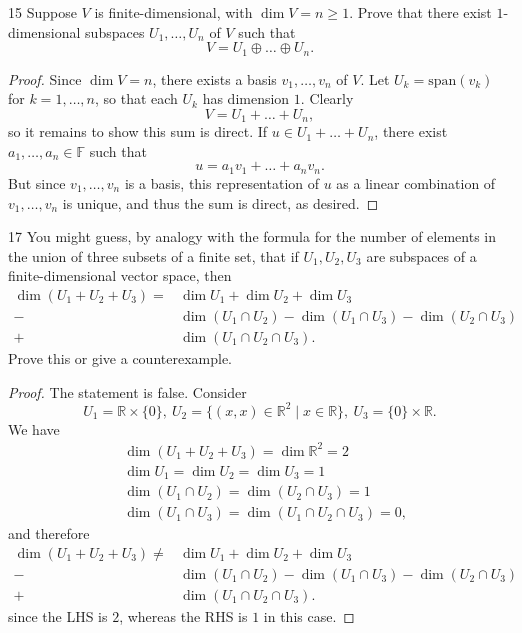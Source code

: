 \documentclass[11pt]{extarticle}
\newenvironment{problem}[1]{\begin{prob*}{#1}{}}{\end{prob*}}
\newcommand{\R}{\mathbb{R}}
\newcommand{\F}{\mathbb{F}}
\newcommand{\Span}{\mathrm{span}}
\begin{document}
\begin{problem}{15}
Suppose $V$ is finite-dimensional, with $\dim V= n\geq 1$.  Prove that there exist $1$-dimensional subspaces $U_1,\dots, U_n$ of $V$ such that 
\begin{equation*}
V = U_1\oplus \dots \oplus U_n.
\end{equation*}
\end{problem}
\begin{proof}
Since $\dim V = n$, there exists a basis $v_1,\dots, v_n$ of $V$.  Let $U_k = \Span(v_k)$ for $k = 1,\dots, n$, so that each $U_k$ has dimension $1$.  Clearly 
\begin{equation*}
V = U_1 + \dots + U_n,
\end{equation*}
so it remains to show this sum is direct.  If $u \in U_1 + \dots + U_n$, there exist $a_1,\dots, a_n\in\F$ such that
\begin{equation*}
u = a_1v_1 + \dots + a_nv_n.
\end{equation*}
But since $v_1,\dots, v_n$ is a basis, this representation of $u$ as a linear combination of $v_1,\dots,v_n$ is unique, and thus the sum is direct, as desired.
\end{proof}

\begin{problem}{17}
You might guess, by analogy with the formula for the number of elements in the union of three subsets of a finite set, that if $U_1,U_2,U_3$ are subspaces of a finite-dimensional vector space, then
\begin{align*}
\dim(U_1+ U_2 + U_3) = &\dim U_1 + \dim U_2 + \dim U_3\\
 			              -&\dim(U_1\cap U_2) - \dim(U_1\cap U_3) - \dim(U_2\cap U_3)\\
			               + &\dim(U_1\cap U_2 \cap U_3).
\end{align*}
Prove this or give a counterexample.
\end{problem}
\begin{proof}
The statement is false.  Consider
\begin{equation*}
U_1 = \R \times\{0\}, ~ U_2 = \{(x, x)\in\R^2\mid x\in\R\}, ~ U_3 = \{0\}\times\R.
\end{equation*}
We have
\begin{align*}
&\dim(U_1 + U_2 + U_3) = \dim\R^2 = 2\\
&\dim U_1 = \dim U_2 = \dim U_3 = 1\\
&\dim(U_1\cap U_2) = \dim(U_2\cap U_3) = 1\\
&\dim(U_1\cap U_3) = \dim(U_1\cap U_2\cap U_3) = 0,
\end{align*}
and therefore 
\begin{align*}
\dim(U_1+ U_2 + U_3) \neq &\dim U_1 + \dim U_2 + \dim U_3\\
 			              -&\dim(U_1\cap U_2) - \dim(U_1\cap U_3) - \dim(U_2\cap U_3)\\
			               + &\dim(U_1\cap U_2 \cap U_3).
\end{align*}
since the LHS is $2$, whereas the RHS is $1$ in this case.
\end{proof}
\end{document}
